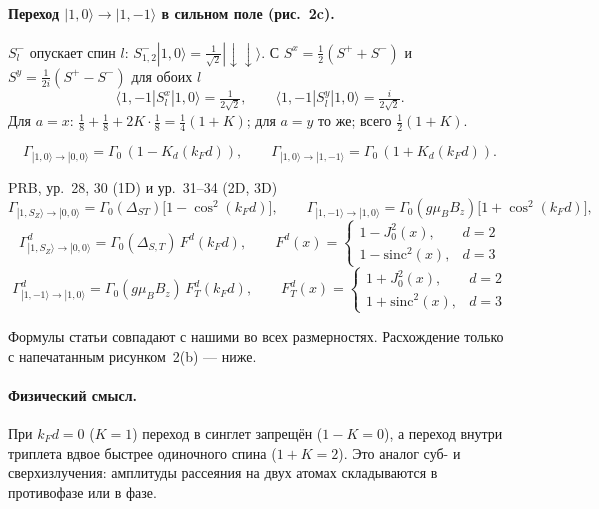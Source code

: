 \paragraph{Переход $|1,0\rangle\to|1,-1\rangle$ в сильном поле (рис.~2c).} $S^-_l$ опускает
спин $l$: $S^-_{1,2}|1,0\rangle=\tfrac1{\sqrt2}|\!\downarrow\downarrow\rangle$. С $S^x=\tfrac12(S^++S^-)$ и
$S^y=\tfrac1{2i}(S^+-S^-)$ для обоих $l$
\[
\langle1,-1|S^x_l|1,0\rangle=\tfrac1{2\sqrt2},\qquad \langle1,-1|S^y_l|1,0\rangle=\tfrac{i}{2\sqrt2}.
\]
Для $a=x$: $\tfrac18+\tfrac18+2K\cdot\tfrac18=\tfrac14(1+K)$; для $a=y$ то же; всего $\tfrac12(1+K)$.
\begin{resbox}
\[
\Gamma_{|1,0\rangle\to|0,0\rangle}=\Gamma_0\,(1-K_d(k_Fd)),\qquad
\Gamma_{|1,0\rangle\to|1,-1\rangle}=\Gamma_0\,(1+K_d(k_Fd)).
\]
\end{resbox}
\begin{paperbox}{PRB, ур.~28, 30 (1D) и ур.~31--34 (2D, 3D)}
\[
\Gamma_{|1,S_Z\rangle\to|0,0\rangle}=\Gamma_0(\Delta_{ST})\big[1-\cos^2(k_Fd)\big],\qquad
\Gamma_{|1,-1\rangle\to|1,0\rangle}=\Gamma_0(g\mu_BB_z)\big[1+\cos^2(k_Fd)\big],
\]
\[
\Gamma^d_{|1,S_Z\rangle\to|0,0\rangle}=\Gamma_0(\Delta_{S,T})\,F^d(k_Fd),\qquad
F^d(x)=\begin{cases}1-J_0^2(x),&d=2\\1-\mathrm{sinc}^2(x),&d=3\end{cases}
\]
\[
\Gamma^d_{|1,-1\rangle\to|1,0\rangle}=\Gamma_0(g\mu_BB_z)\,F^d_T(k_Fd),\qquad
F^d_T(x)=\begin{cases}1+J_0^2(x),&d=2\\1+\mathrm{sinc}^2(x),&d=3\end{cases}
\]
\end{paperbox}
\begin{cmpbox}
Формулы статьи совпадают с нашими во всех размерностях. Расхождение только
с напечатанным рисунком~2(b) --- ниже.
\end{cmpbox}

\paragraph{Физический смысл.} При $k_Fd=0$ ($K=1$) переход в синглет запрещён
($1-K=0$), а переход внутри триплета вдвое быстрее одиночного спина ($1+K=2$).
Это аналог суб- и сверхизлучения: амплитуды рассеяния на двух атомах
складываются в противофазе или в фазе.

